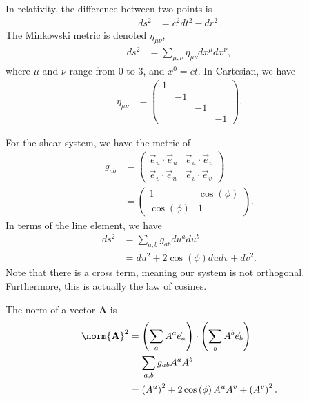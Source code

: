 \documentclass[10pt]{mypackage}
\begin{document}
  \begin{example}
    In relativity, the difference between two points is
    \begin{align*}
      ds^2 &= c^2dt^2 - dr^2.
    \end{align*}
    The Minkowski metric is denoted $\eta_{\mu\nu}$,
    \begin{align*}
      ds^2 &= \sum_{\mu,\nu} \eta_{\mu\nu}dx^{\mu}dx^{\nu},
    \end{align*}
    where $\mu$ and $\nu$ range from $0$ to $3$, and $x^{0} = ct$. In Cartesian, we have
    \begin{align*}
      \eta_{\mu\nu} &= \begin{pmatrix}1 & & & \\ & -1 & & \\ & & -1 & \\ & & & -1\end{pmatrix}.
    \end{align*}
  \end{example}
  \begin{example}
    For the shear system, we have the metric of
    \begin{align*}
      g_{ab} &= \begin{pmatrix}\vec{e}_u\cdot \vec{e}_u & \vec{e}_u\cdot \vec{e}_v\\ \vec{e}_v\cdot \vec{e}_u & \vec{e}_v\cdot \vec{e}_v\end{pmatrix}\\
             &= \begin{pmatrix}1 & \cos\left( \phi \right)\\\cos\left( \phi \right) & 1\end{pmatrix}.
    \end{align*}
    In terms of the line element, we have
    \begin{align*}
      ds^2 &= \sum_{a,b}g_{ab}du^{a}du^{b}\\
           &= du^2 + 2\cos\left( \phi \right)dudv + dv^2.
    \end{align*}
    Note that there is a cross term, meaning our system is not orthogonal. Furthermore, this is actually the law of cosines.\newline

    The norm of a vector $\mathbf{A}$ is
    \begin{align*}
      \norm{\mathbf{A}}^2 &= \left( \sum_{a}A^{a}\vec{e}_a \right)\cdot \left( \sum_{b}A^{b}\vec{e}_b \right)\\
                          &= \sum_{a,b}g_{ab}A^{a}A^{b}\\
                          &= \left( A^{u} \right)^2 + 2\cos\left( \phi \right)A^uA^v + \left( A^v \right)^2.
    \end{align*}
  \end{example}
\end{document}
